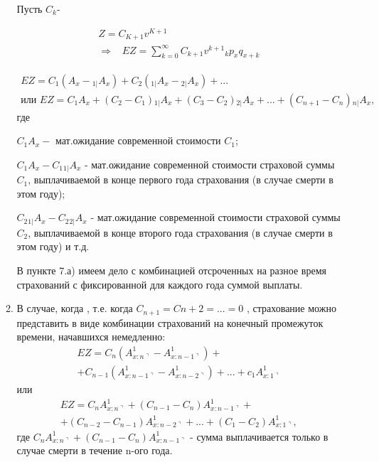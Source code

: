 \begin{enumerate}
\begin{enumerate}
			Пусть $ C_k$-  

			\begin{gather*}
				Z = C_{K+1}v^{K+1}\\
				\Rightarrow \;\;\; EZ = \sum\limits_{k=0}^{\infty}C_{k+1}v^{k+1}{}_kp_xq_{x+k}
			\end{gather*}


			\begin{gather*}
				 EZ = C_1(A_x - {}_{1|}A_x) + C_2({}_{1|}A_x - {}_{2|}A_x)+...\\
				 \text{или  } EZ = C_1A_x + (C_2 -C_1){}_{1|}A_x + (C_3 -C_2){}_{2|}A_x + ...+(C_{n+1}-C_n){}_{n|}A_x,
			\end{gather*}
			где 
			
				$ C_1A_x - \text{ мат.ожидание современной стоимости } C_1$;

				$C_1A_x - C_1{}_{1|}A_x$ -  мат.ожидание современной стоимости страховой суммы $ C_1$, выплачиваемой в конце первого года страхования (в случае смерти в этом году);

				$C_2{}_{1|}A_x - C_2{}_{2|}A_x$ -  мат.ожидание современной стоимости страховой суммы $ C_2$, выплачиваемой в конце второго года страхования (в случае смерти в этом году) и т.д.
			

			\begin{remark}
				В пункте 7.а) имеем дело с комбинацией отсроченных на разное время страхований с фиксированной для каждого года суммой выплаты.
			\end{remark}

			\item В случае, когда , т.е. когда $ C_{n+1} = C{n+2} = ... =0$ , страхование можно представить в виде комбинации страхований на конечный промежуток времени, начавшихся немедленно:
			\begin{gather*}
				EZ = C_n(A_{x:n\urcorner}^{1} - A_{x:n-1\urcorner}^{1}) + \\
				+C_{n-1}(A_{x:n-1\urcorner}^{1}- A_{x:n-2\urcorner}^{1})+...+c_1 A_{x:1\urcorner}^{1}	
			\end{gather*}
			или
			\begin{gather*}
				EZ = C_n A_{x:n\urcorner}^{1} + (C_{n-1}-C_n)A_{x:n-1\urcorner}^{1} +\\
				+(C_{n-2}-C_{n-1})A_{x:n-2\urcorner}^{1}+...+(C_1-C_2)A_{x:1\urcorner}^{1}, 
			\end{gather*}
			где $ C_n A_{x:n\urcorner}^{1} + (C_{n-1}-C_n)A_{x:n-1\urcorner}^{1}$ - сумма выплачивается только в случае смерти в течение n-ого года.


\end{enumerate}
\end{enumerate}
